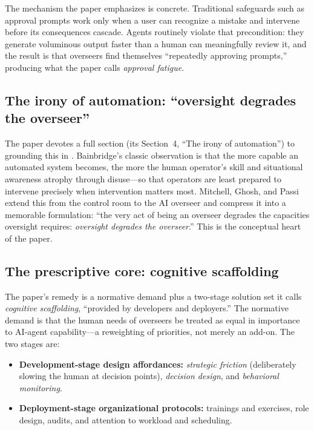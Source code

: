 \documentclass[11pt]{article}
\begin{document}
The mechanism the paper emphasizes is concrete. Traditional safeguards such as approval
prompts work only when a user can recognize a mistake and intervene before its consequences
cascade. Agents routinely violate that precondition: they generate voluminous output faster
than a human can meaningfully review it, and the result is that overseers find themselves
``repeatedly approving prompts,'' producing what the paper calls \emph{approval fatigue}.

\subsection{The irony of automation: ``oversight degrades the overseer''}

The paper devotes a full section (its Section~4, ``The irony of automation'') to grounding
this in \citet{bainbridge1983}. Bainbridge's classic observation is that the more capable an
automated system becomes, the more the human operator's skill and situational awareness
atrophy through disuse---so that operators are least prepared to intervene precisely when
intervention matters most. Mitchell, Ghosh, and Passi extend this from the control room to
the AI overseer and compress it into a memorable formulation: ``the very act of being an
overseer degrades the capacities oversight requires: \emph{oversight degrades the
overseer}.'' This is the conceptual heart of the paper.

\subsection{The prescriptive core: cognitive scaffolding}

The paper's remedy is a normative demand plus a two-stage solution set it calls
\emph{cognitive scaffolding}, ``provided by developers and deployers.'' The normative demand
is that the human needs of overseers be treated as equal in importance to AI-agent
capability---a reweighting of priorities, not merely an add-on. The two stages are:

\begin{itemize}[leftmargin=*,itemsep=2pt]
  \item \textbf{Development-stage design affordances:} \emph{strategic friction}
        (deliberately slowing the human at decision points), \emph{decision design}, and
        \emph{behavioral monitoring}.
  \item \textbf{Deployment-stage organizational protocols:} trainings and exercises, role
        design, audits, and attention to workload and scheduling.
\end{itemize}
\end{document}
